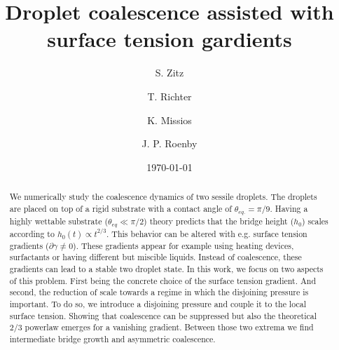 \documentclass[twocolumn,amsmath,amssymb,showpacs,pre,nofootinbib,superscriptaddress]{revtex4-1} %
\begin{document}

\title{Droplet coalescence assisted with surface tension gardients}

\author{S. Zitz}
 \author{T. Richter}%
 \author{K. Missios}%
 \author{J. P. Roenby}%
\date{\today}

\begin{abstract}
We numerically study the coalescence dynamics of two sessile droplets.
The droplets are placed on top of a rigid substrate with a contact angle of $\theta_{eq.} = \pi/9$. 
Having a highly wettable substrate ($\theta_{eq} \ll \pi/2$) theory predicts that the bridge height ($h_0$) scales according to $h_0(t) \propto t^{2/3}.$
This behavior can be altered with e.g. surface tension gradients ($\partial\gamma \neq 0$). 
These gradients appear for example using heating devices, surfactants or having different but miscible liquids.
Instead of coalescence, these gradients can lead to a stable two droplet state. 
In this work, we focus on two aspects of this problem.
First being the concrete choice of the surface tension gradient.
And second, the reduction of scale towards a regime in which the disjoining pressure is important. 
To do so, we introduce a disjoining pressure and couple it to the local surface tension.
Showing that coalescence can be suppressed but also the theoretical $2/3$ powerlaw emerges for a vanishing gradient.
Between those two extrema we find intermediate bridge growth and asymmetric coalescence.
\end{abstract}
\end{document}
